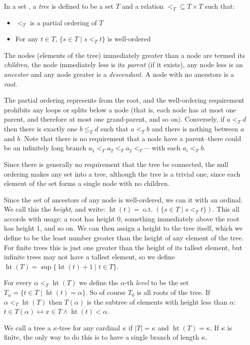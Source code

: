 \documentclass[12pt]{article}
\begin{document}
In a set , a \emph{tree} is defined to be a set $T$ and a relation $<_T\subseteq T\times T$ such that:
\begin{itemize}

\item $<_T$ is a partial ordering of $T$

\item For any $t\in T$, $\{s\in T\mid s<_Tt\}$ is well-ordered

\end{itemize}

The nodes (elements of the tree) immediately greater than a node are termed its \emph{children}, the node immediately less is its \emph{parent} (if it exists), any node less is an \emph{ancestor} and any node greater is a \emph{descendant}.  A node with no ancestors is a \emph{root}.

The partial ordering represents  from the root, and the well-ordering requirement prohibits any loops or splits below a node (that is, each node has at most one parent, and therefore at most one grand-parent, and so on).  Conversely, if $a<_Td$ then there is exactly one $b\leq_Td$ such that $a<_Tb$ and there is nothing between $a$ and $b$.  Note that there is no requirement that a node have a parent--there could be an infinitely long branch $a_1<_Ta_2<_Ta_2<_T\cdots$ with each $a_i<_Tb$.

Since there is generally no requirement that the tree be connected, the null ordering makes any set into a tree, although the tree is a trivial one, since each element of the set forms a single node with no children.

Since the set of ancestors of any node is well-ordered, we can  it with an ordinal.  We call this the \emph{height}, and write: $\operatorname{ht}(t)=\operatorname{o.t.}(\{s\in T\mid s<_Tt\})$.  This all accords with  usage: a root has height $0$, something immediately above the root has height $1$, and so on.  We can then assign a height to the tree itself, which we define to be the least number greater than the height of any element of the tree.  For finite trees this is just one greater than the height of its tallest element, but infinite trees may not have a tallest element, so we define $\operatorname{ht}(T)=\sup\{\operatorname{ht}(t)+1\mid t\in T\}$.

For every $\alpha<_T\operatorname{ht}(T)$ we define the $\alpha$-th \emph{level} to be the set $T_\alpha=\{t\in T\mid\operatorname{ht}(t)=\alpha\}$.  So of course $T_0$ is all roots of the tree.  If $\alpha<_T\operatorname{ht}(T)$ then $T(\alpha)$ is the subtree of elements with height less than $\alpha$: $t\in T(\alpha)\leftrightarrow x\in T \wedge \operatorname{ht}(t)<\alpha$.

We call a tree a $\kappa$-tree for any cardinal $\kappa$ if $|T|=\kappa$ and $\operatorname{ht} (T)=\kappa$.  If $\kappa$ is finite, the only way to do this is to have a single branch of length $\kappa$.
\end{document}
